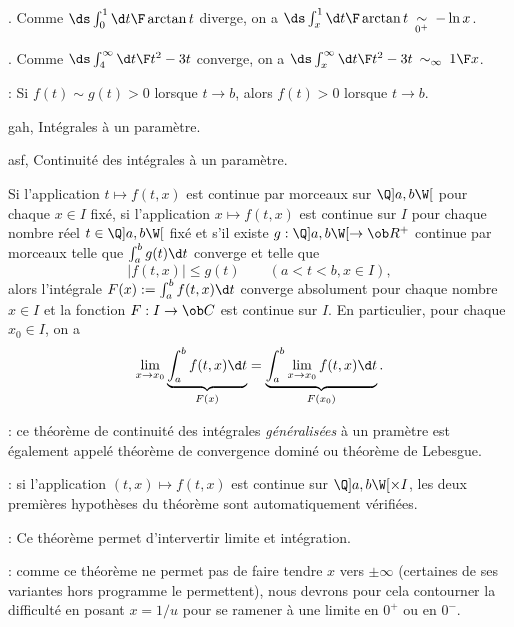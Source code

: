 \Exemple. Comme $\ds \int_0^1{\d t\F\arctan t}$ diverge, on a $\ds \int_x^1{\d t\F\arctan t}\ \mathop{\sim}\limits_{0^+}\ -\ln x$. 
\bigskip

\Exemple. Comme $\ds \int_4^\infty{\d t\F t^2-3t}$ converge, on a $\ds\int_x^\infty{\d t\F t^2-3t}\ \mathop{\sim}_{\infty}\ {1\F x}$. 
\bigskip

\Remarque : Si $f(t)\sim g(t)>0$ lorsque $t\to b$, alors $f(t)>0$ lorsque $t\to b$. 
\bigskip

\Section gah, Intégrales à un paramètre. 
\bigskip


\Subsection asf, Continuité des intégrales à un paramètre. 

\Theoreme [Index=Theoreme@Théorème!de continuite@de continuité des intégrales à un paramètre;Title=Théorème de continuité des intégrales {\it généralisées}à un paramètre;$a<b$ dans $\ol{\ob R}$, $I$ intervalle, $f:(t,x)\mapsto f(t,x)$ application] 
Si l'application $t\mapsto f(t,x)$ est continue par morceaux sur $\Q]a,b\W[$ pour chaque $x\in I$ fixé, \pn
si l'application $x\mapsto f(t,x)$ est continue sur $I$ pour chaque nombre réel $t\in\Q]a,b\W[$ fixé et \pn
s'il existe $g:\Q]a,b\W[\to\ob R^+$ continue par morceaux telle que $\int_a^bg(t)\d t$ converge et telle que 
$$
\big|f(t,x)\big|\le g(t)\qquad(a<t<b, x\in I), 
$$
alors l'intégrale $F(x):=\int_a^bf(t,x)\d t$ converge absolument pour chaque nombre $x\in I$ et 
la fonction $F:I\to\ob C$ est continue sur $I$. En particulier, pour chaque $x_0\in I$, on a 
$$
\lim_{x\to x_0}\underbrace{\int_a^bf(t,x)\d t}_{F(x)}=\underbrace{\int_a^b\lim_{x\to x_0}f(t,x)\d t}_{F(x_0)}. 
$$

%
%

\Remarque : ce théorème de continuité des intégrales {\it généralisées} à un pramètre est également appelé théorème de convergence dominé ou théorème de Lebesgue.

\Remarque : si l'application $(t,x)\mapsto f(t,x)$ est continue sur $\Q]a,b\W[\times I$, les deux premières hypothèses du théorème sont automatiquement vérifiées. 
\bigskip

\Remarque : Ce théorème permet d'intervertir limite et intégration. 
\bigskip

\Remarque : comme ce théorème ne permet pas de faire tendre $x$ vers $\pm\infty$ (certaines de ses variantes hors programme le permettent), nous devrons pour cela contourner la difficulté en posant $x={1/u}$ pour se ramener à une limite en $0^+$ ou en $0^-$. 
\bigskip

